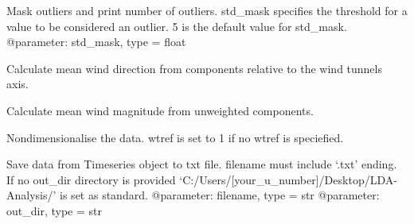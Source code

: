 \documentclass[letterpaper,10pt,english]{sphinxmanual}
\begin{document}
\begin{fulllineitems}
\begin{fulllineitems}
\end{fulllineitems}


\begin{fulllineitems}
\label{\detokenize{index:windtunnel.Timeseries.mask_outliers}}
Mask outliers and print number of outliers. std\_mask specifies the
threshold for a value to be considered an outlier. 5 is the default
value for std\_mask.
@parameter: std\_mask, type = float

\end{fulllineitems}


\begin{fulllineitems}
\label{\detokenize{index:windtunnel.Timeseries.mean_direction}}
Calculate mean wind direction from components relative to the wind
tunnels axis.

\end{fulllineitems}


\begin{fulllineitems}
\label{\detokenize{index:windtunnel.Timeseries.mean_magnitude}}
Calculate mean wind magnitude from unweighted components.

\end{fulllineitems}


\begin{fulllineitems}
\label{\detokenize{index:windtunnel.Timeseries.nondimensionalise}}
Nondimensionalise the data. wtref is set to 1 if no wtref is
speciefied.

\end{fulllineitems}


\begin{fulllineitems}
\label{\detokenize{index:windtunnel.Timeseries.save2file}}
Save data from Timeseries object to txt file. filename must include
‘.txt’ ending. If no out\_dir directory is provided
‘C:/Users/{[}your\_u\_number{]}/Desktop/LDA-Analysis/’ is set as standard.
@parameter: filename, type = str
@parameter: out\_dir, type = str


\end{fulllineitems}
\end{fulllineitems}
\end{document}
